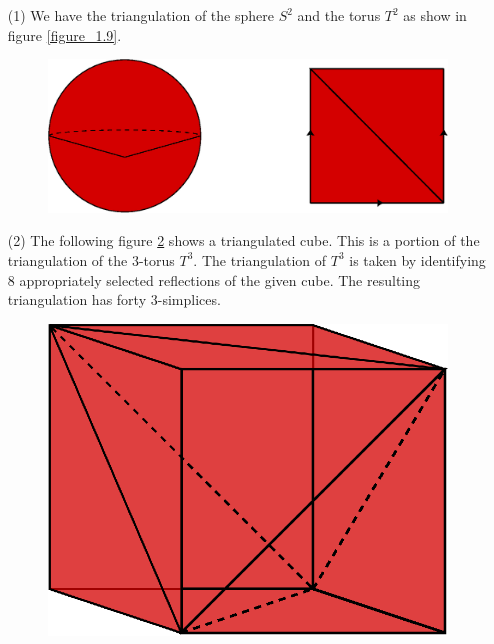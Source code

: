 \begin{example}\label{example_1.14}
    \begin{enumerate}
        \item[(1)] We have the triangulation of the sphere $S^2$ and the torus
            $T^2$ as show in figure \ref{figure_1.9}.
            \begin{figure}[h]
                \centering
                \includegraphics[scale=0.5]{Figures/Chapter1/trangulations_S^2_T^2.eps}
                \caption{}
                \label{figure_1.10}
            \end{figure}

        \item[(2)] The following figure \ref{figure_1.11} shows a triangulated
            cube. This is a portion of the triangulation of the $3$-torus
            $T^3$. The triangulation of  $T^3$ is taken by identifying  $8$
            appropriately selected reflections of the given cube. The resulting
            triangulation has forty $3$-simplices.
            \begin{figure}[h]
                \centering
                \includegraphics[scale=0.5]{Figures/Chapter1/trangulation_T^3.eps}
                \caption{}
                \label{figure_1.11}
            \end{figure}
    \end{enumerate}
\end{example}

